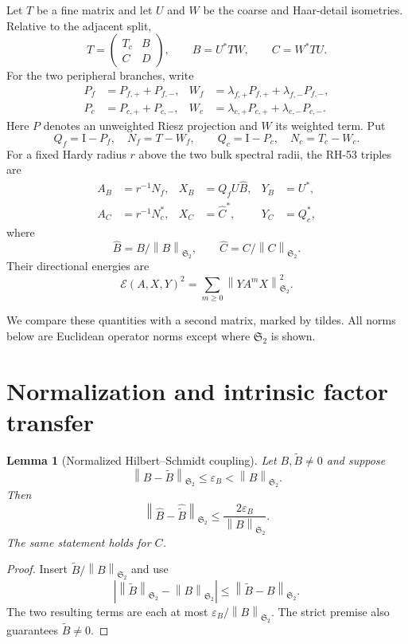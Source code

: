 \documentclass[11pt]{article}
\newtheorem{lemma}[theorem]{Lemma}
\theoremstyle{definition}
\theoremstyle{remark}
\newcommand{\Id}{\mathrm I}
\newcommand{\HS}{\mathfrak S_2}
\newcommand{\cE}{\mathcal E}
\newcommand{\norm}[1]{\left\lVert #1\right\rVert}
\begin{document}
Let $T$ be a fine matrix and let $U$ and $W$ be the coarse and Haar-detail
isometries.  Relative to the adjacent split,
\[
 T=\begin{pmatrix}T_c&B\\ C&D\end{pmatrix},
 \qquad B=U^*TW,
 \qquad C=W^*TU.
\]
For the two peripheral branches, write
\begin{align*}
 P_f&=P_{f,+}+P_{f,-},&
 W_f&=\lambda_{f,+}P_{f,+}+\lambda_{f,-}P_{f,-},\\
 P_c&=P_{c,+}+P_{c,-},&
 W_c&=\lambda_{c,+}P_{c,+}+\lambda_{c,-}P_{c,-}.
\end{align*}
Here $P$ denotes an unweighted Riesz projection and $W$ its weighted term.
Put
\[
 Q_f=\Id-P_f,\quad N_f=T-W_f,
 \qquad Q_c=\Id-P_c,\quad N_c=T_c-W_c.
\]
For a fixed Hardy radius $r$ above the two bulk spectral radii, the RH-53
triples are
\begin{align}
 A_B&=r^{-1}N_f,
 &X_B&=Q_fU\widehat B,
 &Y_B&=U^*,
 \label{eq:left-triple}\\
 A_C&=r^{-1}N_c^*,
 &X_C&=\widehat C^*,
 &Y_C&=Q_c^*,
 \label{eq:right-triple}
\end{align}
where
\[
 \widehat B=B/\norm B_{\HS},
 \qquad
 \widehat C=C/\norm C_{\HS}.
\]
Their directional energies are
\begin{equation}
 \cE(A,X,Y)^2
 =\sum_{m\ge0}\norm{YA^mX}_{\HS}^2.
 \label{eq:energy}
\end{equation}

We compare these quantities with a second matrix, marked by tildes.  All
norms below are Euclidean operator norms except where $\HS$ is shown.

\section{Normalization and intrinsic factor transfer}

\begin{lemma}[Normalized Hilbert--Schmidt coupling]
\label{lem:normalization}
Let $B,\widetilde B\ne0$ and suppose
\[
 \norm{B-\widetilde B}_{\HS}
 \le\varepsilon_B<\norm B_{\HS}.
\]
Then
\begin{equation}
 \boxed{
 \norm{\widehat B-\widehat{\widetilde B}}_{\HS}
 \le\frac{2\varepsilon_B}{\norm B_{\HS}}.}
 \label{eq:normalization}
\end{equation}
The same statement holds for $C$.
\end{lemma}

\begin{proof}
Insert $\widetilde B/\norm B_{\HS}$ and use
\[
 \left|\norm{\widetilde B}_{\HS}-\norm B_{\HS}\right|
 \le\norm{\widetilde B-B}_{\HS}.
\]
The two resulting terms are each at most
$\varepsilon_B/\norm B_{\HS}$.  The strict premise also guarantees
$\widetilde B\ne0$.
\end{proof}
\end{document}
